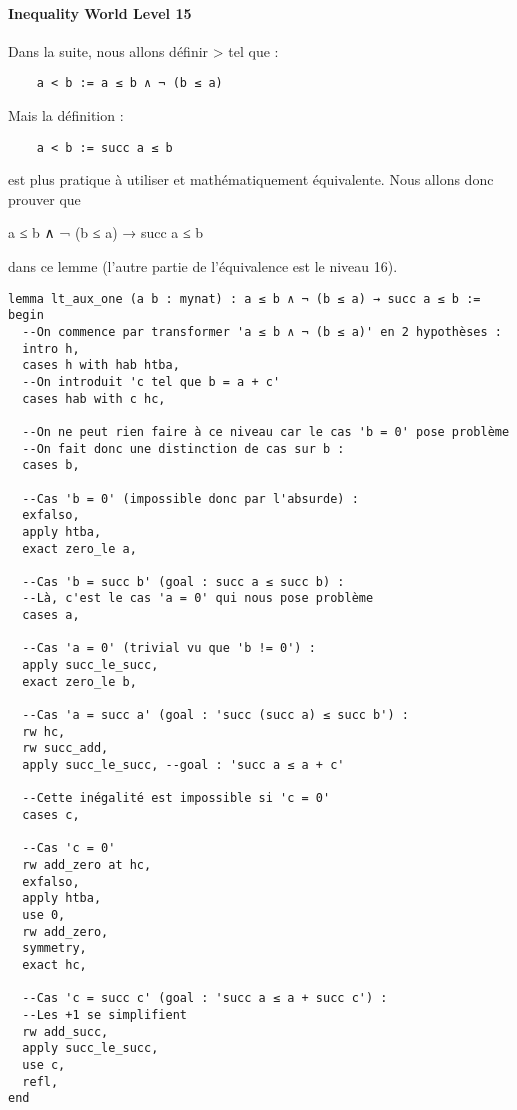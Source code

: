 \paragraph{Inequality World Level 15}

Dans la suite, nous allons définir > tel que :
\begin{verbatim}
    a < b := a ≤ b ∧ ¬ (b ≤ a)
\end{verbatim}
Mais la définition :
\begin{verbatim}
    a < b := succ a ≤ b
\end{verbatim}
est plus pratique à utiliser et mathématiquement équivalente.
Nous allons donc prouver  que 
\begin{ve}
a ≤ b ∧ ¬ (b ≤ a) → succ a ≤ b
\end{ve}
dans ce lemme (l'autre partie de l'équivalence est le niveau 16).

\begin{verbatim}
lemma lt_aux_one (a b : mynat) : a ≤ b ∧ ¬ (b ≤ a) → succ a ≤ b :=
begin
  --On commence par transformer 'a ≤ b ∧ ¬ (b ≤ a)' en 2 hypothèses :
  intro h,
  cases h with hab htba,
  --On introduit 'c tel que b = a + c'
  cases hab with c hc,

  --On ne peut rien faire à ce niveau car le cas 'b = 0' pose problème
  --On fait donc une distinction de cas sur b :
  cases b,

  --Cas 'b = 0' (impossible donc par l'absurde) :
  exfalso,
  apply htba,
  exact zero_le a,

  --Cas 'b = succ b' (goal : succ a ≤ succ b) :
  --Là, c'est le cas 'a = 0' qui nous pose problème
  cases a,

  --Cas 'a = 0' (trivial vu que 'b != 0') :
  apply succ_le_succ,
  exact zero_le b,

  --Cas 'a = succ a' (goal : 'succ (succ a) ≤ succ b') :
  rw hc,
  rw succ_add,
  apply succ_le_succ, --goal : 'succ a ≤ a + c'
  
  --Cette inégalité est impossible si 'c = 0'
  cases c,

  --Cas 'c = 0'
  rw add_zero at hc,
  exfalso,
  apply htba,
  use 0,
  rw add_zero,
  symmetry,
  exact hc,

  --Cas 'c = succ c' (goal : 'succ a ≤ a + succ c') :
  --Les +1 se simplifient
  rw add_succ,
  apply succ_le_succ,
  use c,
  refl,
end
\end{verbatim}